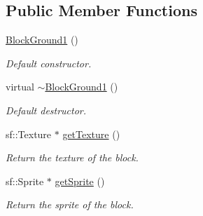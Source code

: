 \subsection*{Public Member Functions}
\begin{DoxyCompactItemize}
\item 
\hypertarget{class_block_ground1_a940fd76a2bb99a72aea37b615250ee5b}{\hyperlink{class_block_ground1_a940fd76a2bb99a72aea37b615250ee5b}{Block\-Ground1} ()}\label{class_block_ground1_a940fd76a2bb99a72aea37b615250ee5b}

\begin{DoxyCompactList}\small\item\em Default constructor. \end{DoxyCompactList}\item 
\hypertarget{class_block_ground1_add8a3546291782546822d80ba08cccba}{virtual \hyperlink{class_block_ground1_add8a3546291782546822d80ba08cccba}{$\sim$\-Block\-Ground1} ()}\label{class_block_ground1_add8a3546291782546822d80ba08cccba}

\begin{DoxyCompactList}\small\item\em Default destructor. \end{DoxyCompactList}\item 
sf\-::\-Texture $\ast$ \hyperlink{class_block_ground1_ae33602300cd0a84d94ce74a1130c77b6}{get\-Texture} ()
\begin{DoxyCompactList}\small\item\em Return the texture of the block. \end{DoxyCompactList}\item 
sf\-::\-Sprite $\ast$ \hyperlink{class_block_ground1_a1764bea828301fadfb0c9a11d43201f7}{get\-Sprite} ()
\begin{DoxyCompactList}\small\item\em Return the sprite of the block. \end{DoxyCompactList}\end{DoxyCompactItemize}
